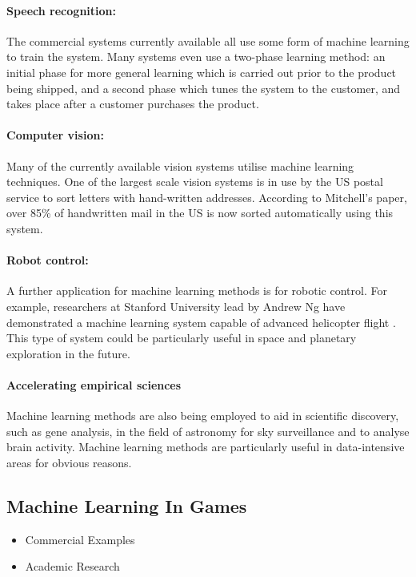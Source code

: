 \documentclass[a4paper,oneside]{report}
\begin{document}
\paragraph{Speech recognition:} The commercial systems currently available all use some form of machine learning to train the system. Many systems even use a two-phase learning method: an initial phase for more general learning which is carried out prior to the product being shipped, and a second phase which tunes the system to the customer, and takes place after a customer purchases the product.

\paragraph{Computer vision:} Many of the currently available vision systems utilise machine learning techniques. One of the largest scale vision systems is in use by the US postal service to sort letters with hand-written addresses. According to Mitchell's paper, over 85\% of handwritten mail in the US is now sorted automatically using this system.

\paragraph{Robot control:} A further application for machine learning methods is for robotic control. For example, researchers at Stanford University lead by Andrew Ng have demonstrated a machine learning system capable of advanced helicopter flight \cite{Ng:2004dz, Abbeel07anapplication, Abbeel:fu}. This type of system could be particularly useful in space and planetary exploration in the future.

\paragraph{Accelerating empirical sciences} Machine learning methods are also being employed to aid in scientific discovery, such as gene analysis, in the field of astronomy for sky surveillance and to analyse brain activity. Machine learning methods are particularly useful in data-intensive areas for obvious reasons.

\subsection{Machine Learning In Games}

\begin{itemize}
	\item Commercial Examples
	\item Academic Research
\end{itemize}
\end{document}
